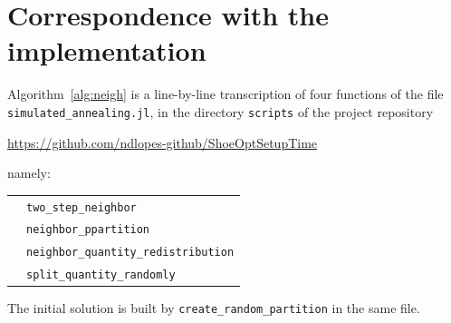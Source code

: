 \documentclass[11pt]{article}
\begin{document}
\section*{Correspondence with the implementation}

Algorithm~\ref{alg:neigh} is a line-by-line transcription of four functions of
the file \texttt{simulated\_annealing.jl}, in the directory \texttt{scripts} of
the project repository
\begin{center}
  \url{https://github.com/ndlopes-github/ShoeOptSetupTime}
\end{center}
\noindent
namely:

\begin{center}
\begin{tabular}{ll}
  \TwoStep{}     & \texttt{two\_step\_neighbor} \\
  \Relocate{}    & \texttt{neighbor\_ppartition} \\
  \Redistribute{} & \texttt{neighbor\_quantity\_redistribution} \\
  \Split{}       & \texttt{split\_quantity\_randomly} \\
\end{tabular}
\end{center}

\noindent
The initial solution is built by \texttt{create\_random\_partition} in the same
file.
\end{document}
